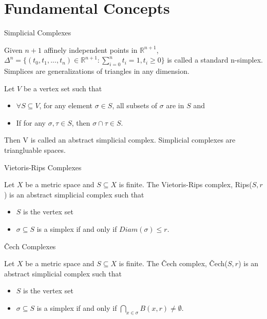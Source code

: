 \documentclass{beamer}
\begin{document}
\section{Fundamental Concepts}
\begin{frame}{Simplicial Complexes}
    \begin{definition}    
        Given $n+1$ affinely independent points in $\mathbb{R}^{n+1}$, $\Delta^{n} = \{(t_0,t_1,...,t_n)\in \mathbb{R}^{n+1} : \sum\limits_{i=0}^{n}t_i=1, t_i \geq 0\}$
        is called a \textcolor{myred}{standard n-simplex}. Simplices are generalizations of triangles in any dimension.
    \end{definition}
    \vspace{0.5cm}
    \begin{definition}     
        Let $V$ be a vertex set such that 
        \begin{itemize}
            \item $\forall S\subseteq V$, for any element $\sigma \in S$, all subsets of $\sigma$ are in $S$ and
            \item If for any $\sigma,\tau \in S$, then $\sigma \cap \tau \in S$.
        \end{itemize}
        Then V is called an \textcolor{myred}{abstract simplicial complex}. Simplicial complexes are triangluable spaces. 
    \end{definition}

\end{frame}


\begin{frame}{Vietoris-Rips Complexes}
    \begin{definition}        
        Let $X$ be a metric space and $S\subseteq X$ is finite. \textcolor{myred}{The Vietoris-Rips complex, Rips($S,r$)} is an abstract simplicial complex such that 
        \begin{itemize}
            \item $S$ is the vertex set
            \item $\sigma\subseteq S$ is a simplex if and only if $Diam(\sigma) \leq r$.
        \end{itemize}
    \end{definition}
\end{frame}


\begin{frame}{Čech Complexes}
    \begin{definition}      
        Let $X$ be a metric space and $S\subseteq X$ is finite. \textcolor{myred}{The Čech complex, Čech($S,r$)} is an abstract simplicial complex such that 
        \begin{itemize}
            \item $S$ is the vertex set
            \item $\sigma\subseteq S$ is a simplex if and only if $\bigcap\limits_{x \in \sigma}B(x,r) \neq \emptyset$.
        \end{itemize}
    \end{definition}
\end{frame}
\end{document}
